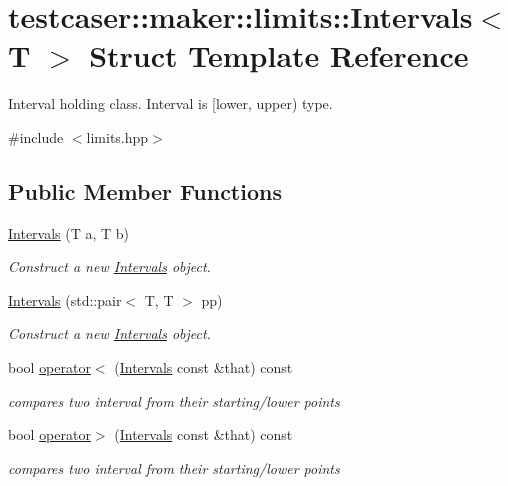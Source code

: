 \hypertarget{structtestcaser_1_1maker_1_1limits_1_1Intervals}{}\section{testcaser\+:\+:maker\+:\+:limits\+:\+:Intervals$<$ T $>$ Struct Template Reference}
\label{structtestcaser_1_1maker_1_1limits_1_1Intervals}


Interval holding class. Interval is \mbox{[}lower, upper) type.  




{\ttfamily \#include $<$limits.\+hpp$>$}

\subsection*{Public Member Functions}
\begin{DoxyCompactItemize}
\item 
\mbox{\hyperlink{structtestcaser_1_1maker_1_1limits_1_1Intervals_a69fe886908002aa20f41ed886fc213ef}{Intervals}} (T a, T b)
\begin{DoxyCompactList}\small\item\em Construct a new \mbox{\hyperlink{structtestcaser_1_1maker_1_1limits_1_1Intervals}{Intervals}} object. \end{DoxyCompactList}\item 
\mbox{\hyperlink{structtestcaser_1_1maker_1_1limits_1_1Intervals_ad899dc031cbffd5247b9b39e23577a52}{Intervals}} (std\+::pair$<$ T, T $>$ pp)
\begin{DoxyCompactList}\small\item\em Construct a new \mbox{\hyperlink{structtestcaser_1_1maker_1_1limits_1_1Intervals}{Intervals}} object. \end{DoxyCompactList}\item 
bool \mbox{\hyperlink{structtestcaser_1_1maker_1_1limits_1_1Intervals_a1473f3baf9f15186106ff0854652bde5}{operator$<$}} (\mbox{\hyperlink{structtestcaser_1_1maker_1_1limits_1_1Intervals}{Intervals}} const \&that) const
\begin{DoxyCompactList}\small\item\em compares two interval from their starting/lower points \end{DoxyCompactList}\item 
bool \mbox{\hyperlink{structtestcaser_1_1maker_1_1limits_1_1Intervals_a01b35e7aa9a3a153b5514733cbcf056e}{operator$>$}} (\mbox{\hyperlink{structtestcaser_1_1maker_1_1limits_1_1Intervals}{Intervals}} const \&that) const
\begin{DoxyCompactList}\small\item\em compares two interval from their starting/lower points \end{DoxyCompactList}\end{DoxyCompactItemize}
